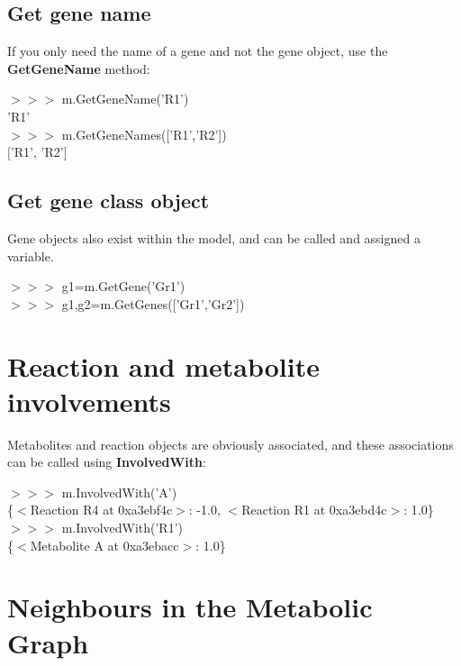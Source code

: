 
\subsection{Get gene name}

If you only need the name of a gene and not the gene object, use the \textbf{GetGeneName} method:

\begin{framed}
$>>>$ m.GetGeneName('R1')\\
'R1'\\

$>>>$ m.GetGeneNames(['R1','R2'])\\
$[$'R1', 'R2'$]$
\end{framed}


\subsection{Get gene class object}
Gene objects also exist within the model, and can be called and assigned a variable.

\begin{framed}
$>>>$ g1=m.GetGene('Gr1')\\
$>>>$ g1,g2=m.GetGenes(['Gr1','Gr2'])
\end{framed}


\section{Reaction and metabolite involvements}

Metabolites and reaction objects are obviously associated, and these associations can be called using \textbf{InvolvedWith}:
\begin{framed}
$>>>$ m.InvolvedWith('A')\\
\{$<$Reaction R4 at 0xa3ebf4c$>$: -1.0, $<$Reaction R1 at 0xa3ebd4c$>$: 1.0\}\\

$>>>$ m.InvolvedWith('R1')\\
\{$<$Metabolite A at 0xa3ebacc$>$: 1.0\}
\end{framed}


\section{Neighbours in the Metabolic Graph}

